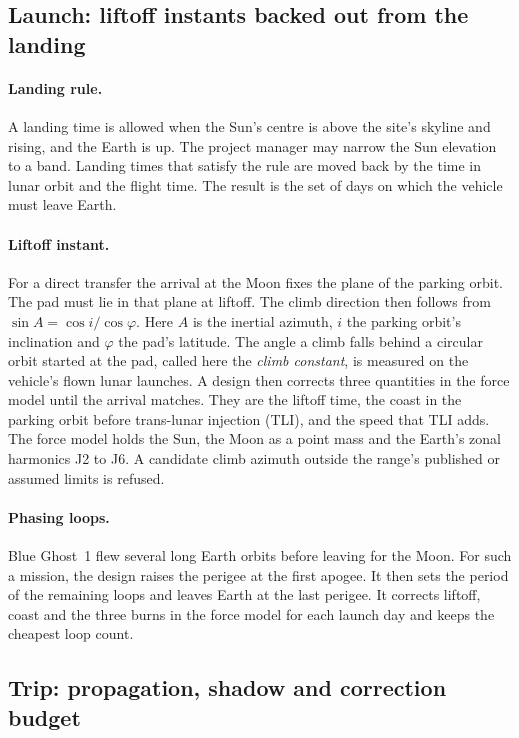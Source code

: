\documentclass[11pt,a4paper]{article}
\begin{document}
\subsection{Launch: liftoff instants backed out from the landing}

\paragraph{Landing rule.} A landing time is allowed when the Sun's centre is above the
site's skyline and rising, and the Earth is up. The project manager may narrow the Sun
elevation to a band. Landing times that satisfy the rule are moved back by the time in lunar orbit and the flight time. The result is the set of days on which the vehicle must leave Earth.

\paragraph{Liftoff instant.} For a direct transfer the arrival at the Moon fixes the
plane of the parking orbit. The pad must lie in that plane at liftoff. The climb direction then follows from $\sin A = \cos i / \cos \varphi$. Here $A$ is the inertial azimuth, $i$ the parking orbit's inclination and $\varphi$ the pad's latitude. The
angle a climb falls behind a circular orbit started at the pad, called here the
\emph{climb constant}, is measured on the vehicle's flown lunar launches. A design then corrects three quantities in the force model until the arrival matches. They are the liftoff time, the coast in the parking orbit before trans-lunar injection (TLI), and the speed that TLI adds. The force model holds the Sun, the Moon as a point mass and the Earth's
zonal harmonics J2 to J6. A candidate climb azimuth outside the range's published or
assumed limits is refused.

\paragraph{Phasing loops.} Blue Ghost~1 flew several long Earth orbits before leaving for
the Moon. For such a mission, the design raises the perigee at the first apogee. It then sets
the period of the remaining loops and leaves Earth at the last perigee. It corrects
liftoff, coast and the three burns in the force model for each launch day and keeps the
cheapest loop count.

\subsection{Trip: propagation, shadow and correction budget}
\end{document}
